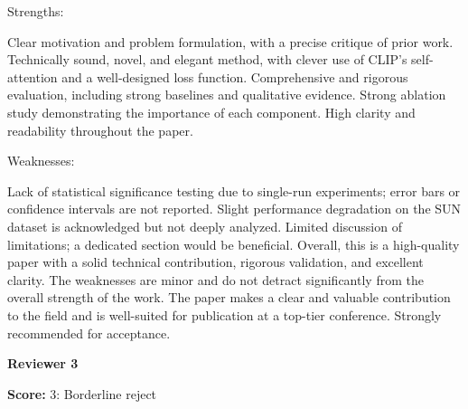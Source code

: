 \begin{tcolorbox}[
    colback=white,
    colframe=black!70,
    title=Reviewer Comments,
    breakable=true,
    fonttitle=\bfseries
]
Strengths:

Clear motivation and problem formulation, with a precise critique of prior work.
Technically sound, novel, and elegant method, with clever use of CLIP's self-attention and a well-designed loss function.
Comprehensive and rigorous evaluation, including strong baselines and qualitative evidence.
Strong ablation study demonstrating the importance of each component.
High clarity and readability throughout the paper.


Weaknesses:

Lack of statistical significance testing due to single-run experiments; error bars or confidence intervals are not reported.
Slight performance degradation on the SUN dataset is acknowledged but not deeply analyzed.
Limited discussion of limitations; a dedicated section would be beneficial.
Overall, this is a high-quality paper with a solid technical contribution, rigorous validation, and excellent clarity. The weaknesses are minor and do not detract significantly from the overall strength of the work. The paper makes a clear and valuable contribution to the field and is well-suited for publication at a top-tier conference. Strongly recommended for acceptance.
\end{tcolorbox}

\textbf{Reviewer 3}


\begin{tcolorbox}[
    colback=gray!5,
    colframe=gray!60,
    title=Review Score,
    fonttitle=\bfseries
]
\textbf{Score:} 3: Borderline reject
\end{tcolorbox}

